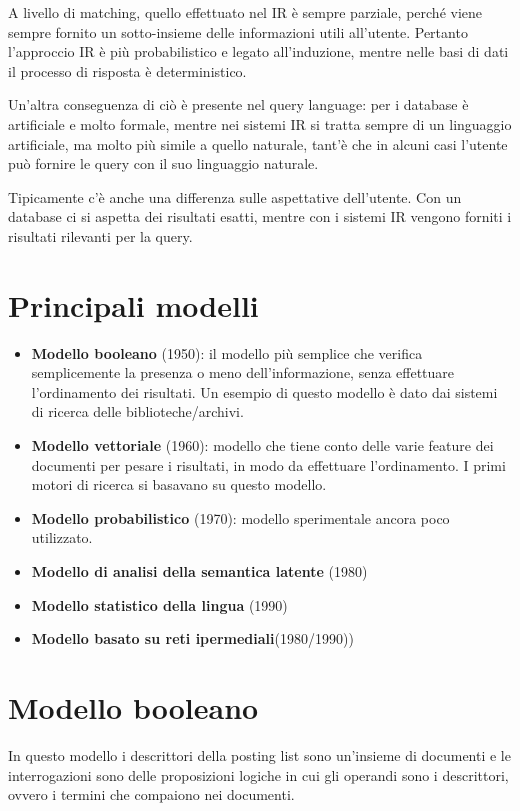 A livello di matching, quello effettuato nel IR è sempre parziale, perché viene sempre fornito un sotto-insieme delle informazioni utili all'utente.
Pertanto l'approccio IR è più probabilistico e legato all'induzione, mentre nelle basi di dati il processo di risposta è deterministico.

Un'altra conseguenza di ciò è presente nel query language: per i database è artificiale e molto formale, mentre nei sistemi IR si tratta sempre di un linguaggio artificiale, ma molto più simile a quello naturale, tant'è che in alcuni casi l'utente può fornire le query con il suo linguaggio naturale.

Tipicamente c'è anche una differenza sulle aspettative dell'utente.
Con un database ci si aspetta dei risultati esatti, mentre con i sistemi IR vengono forniti i risultati rilevanti per la query.

\section{Principali modelli}

\begin{itemize}
	\item \textbf{Modello booleano} (1950): il modello più semplice che verifica semplicemente la presenza o meno dell'informazione, senza effettuare l'ordinamento dei risultati. Un esempio di questo modello è dato dai sistemi di ricerca delle biblioteche/archivi.
	\item \textbf{Modello vettoriale} (1960): modello che tiene conto delle varie feature dei documenti per pesare i risultati, in modo da effettuare l'ordinamento. I primi motori di ricerca si basavano su questo modello.
	\item \textbf{Modello probabilistico} (1970): modello sperimentale ancora poco utilizzato.
	\item \textbf{Modello di analisi della semantica latente} (1980)
	\item \textbf{Modello statistico della lingua} (1990)
	\item \textbf{Modello basato su reti ipermediali}(1980/1990))
\end{itemize}

\section{Modello booleano}


In questo modello i descrittori della posting list sono un'insieme di documenti e le interrogazioni sono delle proposizioni logiche in cui gli operandi sono i descrittori, ovvero i termini che compaiono nei documenti.

